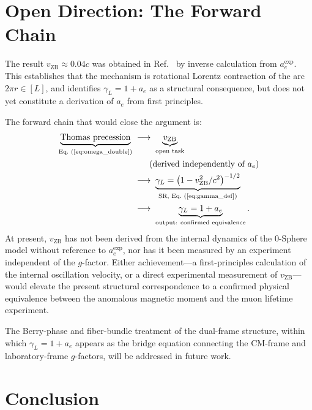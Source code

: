 \documentclass[%
 reprint, amsmath,amssymb, aps, prb, ]{revtex4-2}
\numberwithin{equation}{section}
\newcommand{\vZB}{v_{\text{ZB}}}
\newcommand{\aexp}{a_{e}^{\text{exp}}}
\newcommand{\gammaL}{\gamma_{L}}
\begin{document}
\section{\label{sec:forward}Open Direction: The Forward Chain}

The result $\vZB \approx 0.04c$ was obtained in Ref.~\cite{Hanamura_2023_10} by inverse calculation from $\aexp$. This establishes that the mechanism is rotational Lorentz contraction of the arc $2\pi r \in [L]$, and identifies $\gammaL = 1 + a_e$ as a structural consequence, but does not yet constitute a derivation of $a_e$ from first principles.

The forward chain that would close the argument is:
\begin{align}
\underbrace{\text{Thomas precession}}_{\text{Eq.~(\ref{eq:omega_double})}}
&\;\longrightarrow\;
\underbrace{\vZB}_{\text{open task}}
\notag\\
&\qquad\text{(derived independently of } a_e\text{)}
\notag\\
&\;\longrightarrow\;
\underbrace{\gammaL = \bigl(1-\vZB^2/c^2\bigr)^{-1/2}}_{\text{SR, Eq.~(\ref{eq:gamma_def})}}
\notag\\
&\;\longrightarrow\;
\underbrace{\gammaL = 1 + a_e}_{\text{output: confirmed equivalence}}.
\label{eq:forward_chain}
\end{align}
At present, $\vZB$ has not been derived from the internal dynamics of the 0-Sphere model without reference to $\aexp$, nor has it been measured by an experiment independent of the $g$-factor. Either achievement---a first-principles calculation of the internal oscillation velocity, or a direct experimental measurement of $\vZB$---would elevate the present structural correspondence to a confirmed physical equivalence between the anomalous magnetic moment and the muon lifetime experiment.

The Berry-phase and fiber-bundle treatment of the dual-frame structure, within which $\gammaL = 1 + a_e$ appears as the bridge equation connecting the CM-frame and laboratory-frame $g$-factors, will be addressed in future work.

\section{\label{sec:conclusion}Conclusion}
\end{document}
